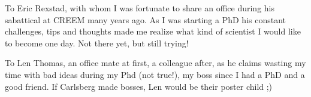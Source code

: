 \documentclass[
]{book}
\begin{document}
To Eric Rexstad, with whom I was fortunate to share an office during his sabattical at CREEM many years ago. As I was starting a PhD his constant challenges, tips and thoughts made me realize what kind of scientist I would like to become one day. Not there yet, but still trying!

To Len Thomas, an office mate at first, a colleague after, as he claims wasting my time with bad ideas during my Phd (not true!), my boss since I had a PhD and a good friend. If Carlsberg made bosses, Len would be their poster child ;)

  
\end{document}
